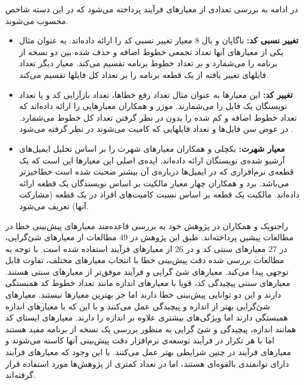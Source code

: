 در ادامه به بررسی تعدادی از معیارهای فرآیند پرداخته می‌شود که در این دسته شاخص محسوب می‌شوند. 
\begin{itemize}
\item \textbf{تغییر نسبی کد: }
ناگاپان و بال 8 معیار تغییر نسبی کد را ارائه داده‌اند\cite{nagappan2005use}. به عنوان مثال یکی از معیار‌های آنها تعداد تجمعی خطوط اضافه و حذف شده بین دو نسخه از برنامه را می‌شمارد و بر تعداد خطوط برنامه تقسیم می‌کند. معیار دیگر تعداد فایلهای تغییر یافته از یک قطعه برنامه را بر تعداد  کل فایلها تقسیم می‌کند. 
\item \textbf{تغییر کد: }
این معیارها به عنوان مثال تعداد رفع خطاها، تعداد بازآرایی کد و یا تعداد نویسنگان یک فایل را می‌شمارند. موزر و همکاران معیارهایی را ارائه داده‌اند که تعداد خطوط اضافه و کم شده را بدون در نظر گرفتن تعداد کل خطوط می‌شمارد. در عوض سن فایل‌ها و تعداد فایلهایی که کامیت می‌شوند در نظر گرفته می‌شود \cite{moser2008comparative}. 
\item \textbf{معیار شهرت: }
 بکچلی و همکاران معیارهای شهرت را بر اساس تحلیل ایمیل‌های آرشیو شده‌ی نویسنگان ارائه داده‌اند. ایده‌ی اصلی این معیارها این است که یک قطعه‌ی  نرم‌افزاری که در ایمیل‌ها درباره‌ی آن بیشتر صحبت شده است خطاخیزتر می‌باشد\cite{bacchelli2010popular}. برد و همکاران چهار معیار مالکیت بر اساس نویسندگان یک قطعه ارائه داده‌اند. مالکیت یک قطعه بر اساس نسبت کامیت‌های  افراد  در یک قطعه (مشارکت آنها) تعریف می‌شود. \\
\end{itemize}


راجنویک و همکاران در پژوهش خود به بررسی قاعده‌مند معیارهای پیش‌بینی خطا در مطالعات پیشین پرداخته‌اند.  طبق این پژوهش در 49\lr{\%} مطالعات از معیارهای شئ‌گرایی، در 27\lr{\%} معیارهای سنتی کد و در 26 \lr{\%} از معیارهای فرآیند استفاده شده است. با توجه به مطالعات بررسی شده دقت پیش‌بینی خطا  با انتخاب معیارهای مختلف، تفاوت قابل توجهی  پیدا می‌کند. معیارهای شئ گرایی و فرآیند موفق‌تر از معیارهای سنتی هستند. معیارهای سنتی  پیچیدگی کد، قویا با معیارهای اندازه مانند تعداد خطوط کد همبستگی دارند و این دو توانایی پیش‌بینی خطا دارند اما جز بهترین معیارها نیستند. معیارهای شئ‌گرایی بهتر از اندازه و پیچیدگی عمل می‌کنند و با این که با معیارهای اندازه همبستگی دارند اما ویژگی‌های بیشتری علاوه بر اندازه را دارند. معیارهای ایستای کد همانند اندازه، پیچیدگی و شئ گرایی به منظور بررسی یک نسخه از برنامه مفید هستند اما با هر تکرار در فرآیند توسعه‌ی نرم‌افزار دقت پیش‌بینی آنها کاسته می‌شوند و معیارهای فرآیند در چنین شرایطی بهتر عمل می‌کنند.  با این وجود  که  معیارهای فرآیند‌  دارای توانمندی بالقوه‌ای  هستند، اما در تعداد کمتری از پژوهش‌ها مورد استفاده قرار گرفته‌اند\cite{radjenovic2013software}. \\
 
